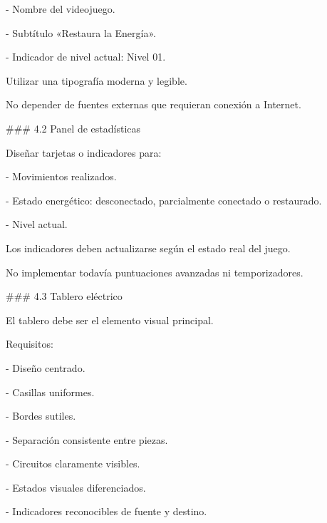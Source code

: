 \noindent - Nombre del videojuego.\par
\noindent - Subtítulo «Restaura la Energía».\par
\noindent - Indicador de nivel actual: Nivel 01.\par
\par\smallskip
\noindent Utilizar una tipografía moderna y legible.\par
\par\smallskip
\noindent No depender de fuentes externas que requieran conexión a Internet.\par
\par\smallskip
\noindent \#\#\# 4.2 Panel de estadísticas\par
\par\smallskip
\noindent Diseñar tarjetas o indicadores para:\par
\par\smallskip
\noindent - Movimientos realizados.\par
\noindent - Estado energético: desconectado, parcialmente conectado o restaurado.\par
\noindent - Nivel actual.\par
\par\smallskip
\noindent Los indicadores deben actualizarse según el estado real del juego.\par
\par\smallskip
\noindent No implementar todavía puntuaciones avanzadas ni temporizadores.\par
\par\smallskip
\noindent \#\#\# 4.3 Tablero eléctrico\par
\par\smallskip
\noindent El tablero debe ser el elemento visual principal.\par
\par\smallskip
\noindent Requisitos:\par
\par\smallskip
\noindent - Diseño centrado.\par
\noindent - Casillas uniformes.\par
\noindent - Bordes sutiles.\par
\noindent - Separación consistente entre piezas.\par
\noindent - Circuitos claramente visibles.\par
\noindent - Estados visuales diferenciados.\par
\noindent - Indicadores reconocibles de fuente y destino.\par
